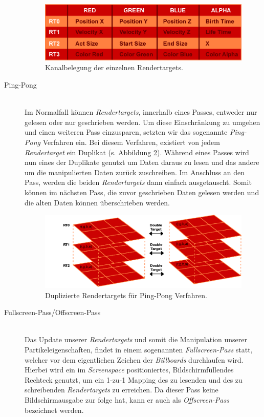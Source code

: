 \begin{Spacing}{\mylinespace}
\begin{description}
\begin{figure}[h!]
	\centering
	\vspace*{55px}
	\includegraphics[width=410px]{graphics/RendertargetsChannels.png}
	\caption{Kanalbelegung der einzelnen Rendertargets.}
	\label{fig:RTCahnnels}
\end{figure}	

\newpage

	\item[Ping-Pong] \hfill \\
	Im Normalfall können \textit{Rendertargets}, innerhalb eines Passes, entweder nur gelesen oder nur geschrieben werden. Um diese Einschränkung zu umgehen und einen weiteren Pass einzusparen, setzten wir das sogenannte \textit{Ping-Pong} Verfahren ein. Bei diesem Verfahren, existiert von jedem \textit{Rendertarget} ein Duplikat (s. Abbildung \ref{fig:DoubleTarget}). Während eines Passes wird nun eines der Duplikate genutzt um Daten daraus zu lesen und das andere um die manipulierten Daten zurück zuschreiben. Im Anschluss an den Pass, werden die beiden \textit{Rendertargets} dann einfach ausgetauscht. Somit können im nächsten Pass, die zuvor geschrieben Daten gelesen werden und die alten Daten können überschrieben werden.
	
\begin{figure}[h!]
	\centering
	\vspace*{10px}
	\includegraphics[width=410px]{graphics/DoubleTargets2.png}
	\caption{Duplizierte Rendertargets für Ping-Pong Verfahren.}
	\label{fig:DoubleTarget}
\end{figure}

\item[Fullscreen-Pass/Offscreen-Pass] \hfill \\
Das Update unserer \textit{Rendertargets} und somit die Manipulation unserer Partikeleigenschaften, findet in einem sogenannten \textit{Fullscreen-Pass} statt, welcher vor dem eigentlichen Zeichen der \textit{Billboards} durchlaufen wird. Hierbei wird ein im \textit{Screenspace} positioniertes, Bildschirmfüllendes Rechteck genutzt, um ein 1-zu-1 Mapping des zu lesenden und des zu schreibenden \textit{Rendertargets} zu erreichen. Da dieser Pass keine Bildschirmausgabe zur folge hat, kann er auch als \textit{Offscreen-Pass} bezeichnet werden.


\end{description}
\end{Spacing}
